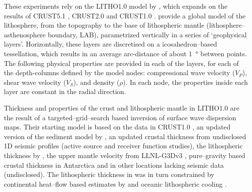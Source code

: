 These experiments rely on the {LITHO1.0} model by \textcite{Pasyanos2014}, which expands on the results of CRUST5.1 \parencite{Mooney1998_Crust51}, CRUST2.0 \parencite{Bassin2000Crust20} and CRUST1.0 \parencite{Laske2012Crust10}.
\Textcite{Pasyanos2014} provide a global model of the lithosphere, from the topography to the base of lithospheric mantle (lithosphere--asthenosphere boundary, LAB), parametrized vertically in a series of `geophysical layers'.
Horizontally, these layers are discretised on a icosahedron--based tessellation, which results in an average arc-distance of about \SI{1}{\degree} between points.
The following physical properties are provided in each of the layers, for each of the depth-columns defined by the model nodes: compressional wave velocity ($V_{P}$), shear wave velocity ($V_{S}$), and density ($\rho$).
In each node, the properties inside each layer are constant in the radial direction.

Thickness and properties of the crust and lithospheric mantle in {LITHO1.0} are the result of a targeted--grid--search based inversion of surface wave dispersion maps.
Their starting model is based on the data in {CRUST1.0} \parencite{Laske2012Crust10}, an updated version of the sediment model by \textcite{Laske1997_sediments}, an updated crustal thickness from undisclosed 1D seismic profiles (active source and receiver function studies), the lithospheric thickness by \textcite{Pasyanos2005}, the upper mantle velocity from {LLNL-G3Dv3} \parencite{Simmons2012_LLNL}, pure--gravity based crustal thickness in Antarctica \parencite{Block2009} and in other locations lacking seismic data (undisclosed).
The lithospheric thickness in \textcite{Pasyanos2005} was in turn constrained by continental heat--flow based estimates by \textcite{Artemieva2006} and oceanic lithospheric cooling \parencite{Turcotte1982_geodynamics}.

\begin{table}
    \caption[Thickness and density of the layers from {LITHO1.0}.]{
        Average (\textbf{Avg.}) and standard deviation (\textbf{SD}) of thickness and density of the layers from {LITHO1.0} \parencite{Pasyanos2014}.
        {SEDS}:~sediments,
        {CRUST}:~crystalline crust (basement to Moho),
        {LID}:~lithospheric mantle (Moho to LAB).
        See Tab.~\ref{tab:LithoLayersGroups} for the statistics on aggregated layers.
    }
    \begin{adjustbox}{center}
        
    \end{adjustbox}
    \label{tab:LithoLayers}
\end{table}

